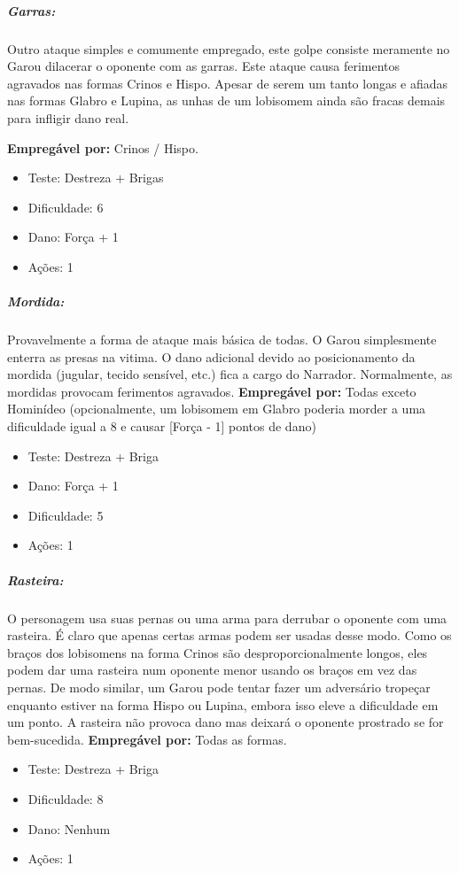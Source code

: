 \subparagraph{\bf Garras:}
Outro ataque simples e comumente empregado, este golpe consiste meramente no Garou dilacerar o oponente com as garras. Este ataque causa ferimentos agravados nas formas Crinos e Hispo. Apesar de serem um tanto longas e afiadas nas formas Glabro e Lupina, as unhas de um lobisomem ainda são fracas demais para infligir dano real.

{\bf Empregável por:} Crinos / Hispo.
\begin{itemize}[noitemsep]
\item Teste: Destreza + Brigas
\item Dificuldade: 6
\item Dano: Força + 1
\item Ações: 1
\end{itemize}

\subparagraph{\bf Mordida:}\label{mordida}
Provavelmente a forma de ataque mais básica de todas. O Garou simplesmente enterra as presas na vitima. O dano adicional devido ao posicionamento da mordida (jugular, tecido sensível, etc.) fica a cargo do Narrador. Normalmente, as mordidas provocam ferimentos agravados.
{\bf Empregável por:} Todas exceto Hominídeo (opcionalmente, um lobisomem em Glabro poderia morder a uma dificuldade igual a 8 e causar [Força - 1] pontos de dano)
\begin{itemize}[noitemsep]
\item Teste: Destreza + Briga
\item Dano: Força + 1
\item Dificuldade: 5
\item Ações: 1
\end{itemize}

\subparagraph{\bf Rasteira:}
O personagem usa suas pernas ou uma arma para derrubar o oponente com uma rasteira. É claro que apenas certas armas podem ser usadas desse modo. Como os braços dos lobisomens na forma Crinos são desproporcionalmente longos, eles podem dar uma rasteira num oponente menor usando os braços em vez das pernas. De modo similar, um Garou pode tentar fazer um adversário tropeçar enquanto estiver na forma Hispo ou Lupina, embora isso eleve a dificuldade em um ponto.
A rasteira não provoca dano mas deixará o oponente prostrado se for bem-sucedida.
{\bf Empregável por:} Todas as formas.
\begin{itemize}[noitemsep]
\item Teste: Destreza + Briga
\item Dificuldade: 8
\item Dano: Nenhum
\item Ações: 1
\end{itemize}

